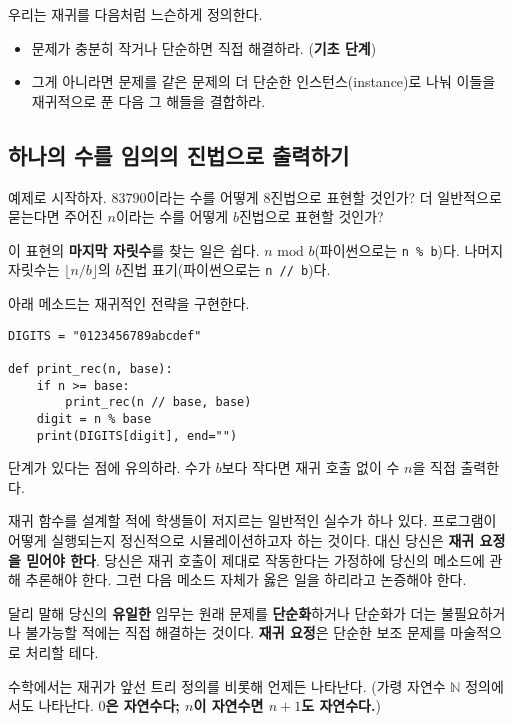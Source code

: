 \documentclass[a4paper]{oblivoir}
\begin{document}
우리는 재귀를 다음처럼 느슨하게 정의한다.

\begin{itemize}
    \item 문제가 충분히 작거나 단순하면 직접 해결하라. (\textbf{기초 단계})
    \item 그게 아니라면 문제를 같은 문제의 더 단순한 인스턴스(instance)로 나눠 이들을 재귀적으로 푼 다음 그 해들을 결합하라.
\end{itemize}

\subsection*{하나의 수를 임의의 진법으로 출력하기}
 예제로 시작하자. $83790$이라는 수를 어떻게 $8$진법으로 표현할 것인가? 더 일반적으로 묻는다면 주어진 $n$이라는 수를 어떻게 $b$진법으로 표현할 것인가?

이 표현의 \textbf{마지막 자릿수}를 찾는 일은 쉽다. $n \textrm{ mod } b$(파이썬으로는 \texttt{n \% b})다. 나머지 자릿수는 $\lfloor n/b \rfloor$의 $b$진법 표기(파이썬으로는 \texttt{n // b})다. 

아래 메소드는 재귀적인 전략을 구현한다. 

\begin{verbatim}
DIGITS = "0123456789abcdef"

def print_rec(n, base):
	if n >= base:
		print_rec(n // base, base)
	digit = n % base
	print(DIGITS[digit], end="")
\end{verbatim}

 단계가 있다는 점에 유의하라. 수가 $b$보다 작다면 재귀 호출 없이 수 $n$을 직접 출력한다.

재귀 함수를 설계할 적에 학생들이 저지르는 일반적인 실수가 하나 있다. 프로그램이 어떻게 실행되는지 정신적으로 시뮬레이션하고자 하는 것이다. 대신 당신은 \textbf{재귀 요정을 믿어야 한다}. 당신은 재귀 호출이 제대로 작동한다는 가정하에 당신의 메소드에 관해 추론해야 한다. 그런 다음 메소드 자체가 옳은 일을 하리라고 논증해야 한다. 

달리 말해 당신의 \textbf{유일한} 임무는 원래 문제를 \textbf{단순화}하거나 단순화가 더는 불필요하거나 불가능할 적에는 직접 해결하는 것이다. \textbf{재귀 요정}은 단순한 보조 문제를 마술적으로 처리할 테다.

수학에서는 재귀가 앞선 트리 정의를 비롯해 언제든 나타난다. (가령 자연수 $\mathbb{N}$ 정의에서도 나타난다. \textbf{$0$은 자연수다; $n$이 자연수면 $n+1$도 자연수다.})
\end{document}
